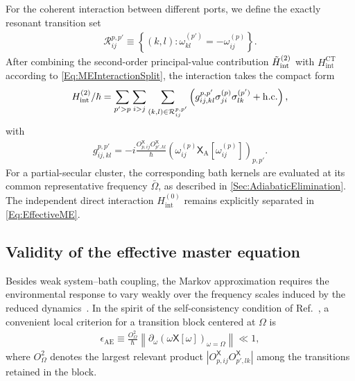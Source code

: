 \documentclass[prx,aps,twocolumn,article]{revtex4-2}
\newcommand{\msf}[1]{\mathsf{#1}}
\newcommand{\hc}{\mathrm{h.c.}}
\newcommand{\msXA}{\msX_\mathrm{A}}
\newcommand{\msX}{\msf{X}}
\begin{document}
For the coherent interaction between different ports, we define the exactly resonant transition set
\begin{align}
    \mathcal R_{ij}^{p,p'}
    \equiv
    \left\{
        (k,l):
        \omega_{kl}^{(p')}
        =
        -\omega_{ij}^{(p)}
    \right\}.
\end{align}
After combining the second-order principal-value contribution
$\tilde{H}_{\rm int}^{(2)}$ with
$H_{\mathrm{int}}^{\mathrm{CT}}$ according to
\cref{Eq:MEInteractionSplit}, the interaction takes the compact form
\begin{align}
    H_{\rm int}^{(2)}/\hbar
    =
    \sum_{p'>p}
    \sum_{i>j}
    \sum_{(k,l)\in\mathcal R_{ij}^{p,p'}}
    \left(
        g_{ij,kl}^{p,p'}
        \sigma_{ji}^{(p)}
        \sigma_{lk}^{(p')}
        +
        \hc
    \right),
\end{align}
with
\begin{align}
    g_{ij,kl}^{p,p'}
    =
    -i
    \frac{
        O_{p,ij}^{\msX}
        O_{p',kl}^{\msX}
    }{\hbar}
    \left(
        \omega_{ij}^{(p)}
        \msXA[
            \omega_{ij}^{(p)}
        ]
    \right)_{p,p'}.
\label{Eq:CoherentCoupling}
\end{align}
For a partial-secular cluster, the corresponding bath kernels are evaluated
at its common representative frequency $\bar\Omega$, as described in \cref{Sec:AdiabaticElimination}. The independent direct interaction
$H_{\mathrm{int}}^{(0)}$ remains explicitly separated in
\cref{Eq:EffectiveME}.




\subsection{Validity of the effective master equation}
\label{Sec:ValidityAE}


Besides weak system--bath coupling, the Markov approximation requires the
environmental response to vary weakly over the frequency scales induced by
the reduced dynamics~\cite{BreuerPetruccione:2002,Hassler:2019}. In the
spirit of the self-consistency condition of Ref.~\cite{Hassler:2019}, a
convenient local criterion for a transition block centered at $\Omega$ is
\begin{align}
    \epsilon_{\mathrm{AE}}
    \equiv
    \frac{O_{\Omega}^{2}}{\hbar}
    \left\|
        \partial_\omega
        \left(
            \omega\msX[\omega]
        \right)_{\omega=\Omega}
    \right\|
    \ll 1,
    \label{Eq:ValidityAE}
\end{align}
where $O_{\Omega}^{2}$ denotes the largest relevant product
$|O_{p,ij}^{\msX}O_{p',lk}^{\msX}|$ among the transitions retained in the block.
\end{document}

